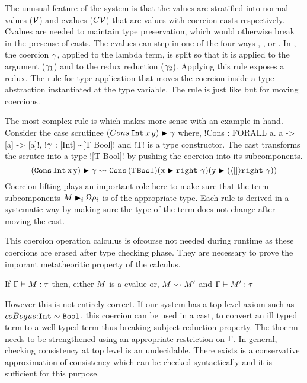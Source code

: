 \documentclass[manuscript,screen,nonacm]{acmart}
\begin{document}
The unusual feature of the system is that the values are stratified into normal values ($\mathcal{V}$) and cvalues ($C\mathcal{V}$) that are values with coercion casts respectively. Cvalues are needed to maintain type preservation, which would otherwise break in the presense of casts. The cvalues can step in one of the four ways , ,  or . In , the coercion $\gamma$, applied to the lambda term, is split so that it is applied to the argument ($\gamma_1$) and to the redux reduction ($\gamma_2$). Applying this rule exposes a \trule{$\beta$} redux. The rule  for type application that moves the coercion inside a type abstraction instantiated at the type variable.
The rule  is just like  but for moving coercions.

The most complex rule is  which makes more sense with an example in hand. Consider the case scrutinee $(Cons\, \texttt{Int}\, x\, y)\mathrel{\blacktriangleright}\gamma$ where, !Cons : FORALL a. a -> [a] -> [a]!, !$\gamma$ : [Int] \sim [T Bool]! and !T! is a type constructor. The cast transforms the scrutee into a type ![T Bool]! by pushing the coercion into its subcomponents.
$$
(\texttt{Cons}\, \texttt{Int}\, \texttt{x}\, \texttt{y})\mathrel{\blacktriangleright}\gamma \rightsquigarrow \texttt{Cons} \, (\texttt{T}\, \texttt{Bool}) (\texttt{x}\mathrel{\blacktriangleright}\texttt{right}~\gamma) (\texttt{y}\mathrel{\blacktriangleright}(\langle[]\rangle\texttt{right}~\gamma))
$$
Coercion lifting plays an important role here to make sure that the term subcomponents $M\mathrel{\blacktriangleright}_i {\Omega}\rho_i$ is of the appropriate type. Each rule is derived in a systematic way by making sure the type of the term does not change after moving the cast.

This coercion operation calculus is ofcourse not needed during runtime as these coercions are erased after type checking phase. They are necessary to prove the imporant metatheoritic property of the calculus.

\begin{theorem}
  If $\Gamma \vdash M : \tau$ then, either $M$ is a cvalue or, $M \rightsquigarrow M'$ and
  $\Gamma \vdash M' : \tau$
\end{theorem}

However this is not entirely correct. If our system has a top level axiom such as $coBogus {:} \texttt{Int} \sim \texttt{Bool}$, this coercion can be used in a cast, to convert an ill typed term to a well typed term thus breaking subject reduction property. The thoerm needs to be strengthened using an appropriate restriction on $\Gamma$. In general, checking consistency at top level is an undecidable. There exists is a conservative approximation of consistency which can be checked syntactically and it is sufficient for this purpose.
\end{document}
